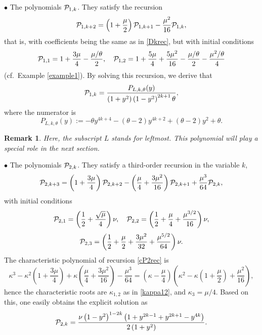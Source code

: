 \documentclass[a4paper]{article}
\newtheorem{remark}{Remark}
\newcommand{\te}{\theta}
\newcommand{\Pol}{P_{L,k,\te}(y)}
\newcommand{\cP}{{\cal{P}}}
\begin{document}
$\bullet$  The polynomials $\cP_{1,k}$. They satisfy the recursion 
\[
\cP_{1,k+2}=\left(1+\frac{\mu}{2}\right)\cP_{1,k+1}-\frac{\mu^2}{16}\cP_{1,k},
\]
that is, with coefficients being the same as in \eqref{Dkrec}, but with initial conditions
\[
\cP_{1,1}=1+\frac{3 \mu }{4}-\frac{\mu /\theta}{2  }, \quad \cP_{1,2}=1+\frac{5 \mu }{4}+\frac{5 \mu ^2}{16}-\frac{\mu/\theta }{2  }-\frac{\mu ^2/\theta}{4  }
\]
(cf.~Example \ref{example1}). By solving this recursion, we derive that
\begin{equation}\label{P1kexpl}
\cP_{1,k}=\frac{\Pol}{  \left(1+y^2\right)\left(1-y^2\right)^{2 k+1}\theta},
\end{equation}
where the numerator is 
\begin{equation}\label{poldef}
\Pol:=-\theta  y^{4 k+4}-(\theta -2) y^{4 k+2}+(\theta -2) y^2+\theta.
\end{equation}
\begin{remark}
Here, the subscript $L$ stands for \emph{leftmost}. This polynomial will play a special role in the next section.
\end{remark}


$\bullet$  The polynomials $\cP_{2,k}$. They satisfy a third-order recursion in the variable $k$,
\begin{equation}\label{cP2rec}
\cP_{2,k+3}=\left(1+\frac{3\mu}{4}\right)\cP_{2,k+2}-\left(\frac{\mu }{4}+\frac{3 \mu ^2}{16}\right)\cP_{2,k+1}+\frac{\mu ^3}{64}\cP_{2,k},
\end{equation}
with initial conditions 
\[
\cP_{2,1}=\left(\frac{1}{2}+\frac{\sqrt{\mu }}{4}\right) \nu, \quad \cP_{2,2}=\left(\frac{1}{2}+\frac{\mu }{4}+\frac{\mu ^{3/2}}{16}\right) \nu,
\]
\[
\cP_{2,3}=\left(\frac{1}{2}+\frac{\mu }{2}+\frac{3 \mu ^2}{32}+\frac{\mu ^{5/2}}{64}\right) \nu.
\]
The  characteristic polynomial of recursion \eqref{cP2rec} is 
\[
\kappa ^3-\kappa ^2 \left(1+\frac{3 \mu }{4}\right)+\kappa  \left(\frac{\mu }{4}+\frac{3 \mu ^2}{16}\right)-\frac{\mu ^3}{64}=\left(\kappa-\frac{\mu }{4}\right)\left(\kappa ^2-\kappa  \left(1+\frac{\mu }{2}\right)+\frac{\mu ^2}{16}\right),
\]
hence the characteristic roots are $\kappa_{1,2}$ as in \eqref{kappa12}, and $\kappa_3={\mu }/{4}$. Based on this, one easily obtains the explicit solution as
\begin{equation}\label{cP2kexpl}
\cP_{2,k}=\frac{\nu  \left(1-y^2\right)^{1-2 k} \left(1+y^{2 k-1}+y^{2 k+1}-y^{4 k}\right)}{2 \left(1+y^2\right)}.
\end{equation}
\end{document}
